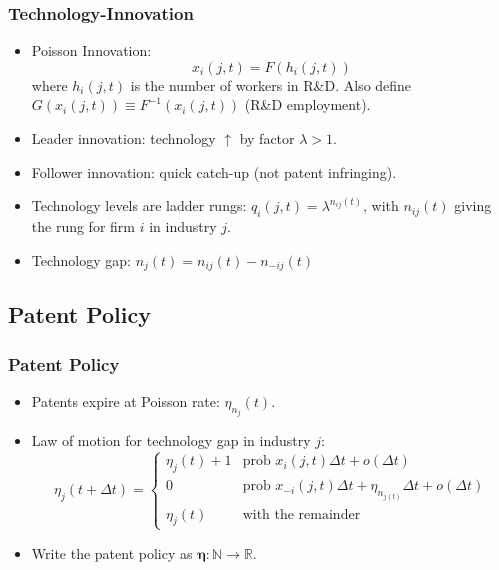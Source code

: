 \documentclass{beamer}
\begin{document}
\begin{frame}[t]\frametitle{Technology-Innovation} 
  \begin{itemize}
    \item<+-> Poisson Innovation:
      \begin{equation*} \label{eq:tech_rd_technology}
        x_i(j, t) = F(h_i(j, t))
      \end{equation*}
      where $h_i(j, t)$ is the number of workers in R\&D.
      Also define $G(x_i(j,t)) \equiv F^{-1}(x_i(j,t))$ (R\&D employment).
    \item<+-> Leader innovation: technology $\uparrow$ by factor $\lambda > 1$.
    \item<+-> Follower innovation: quick catch-up (not patent infringing).
    \item<+-> Technology levels are ladder rungs: $q_i(j, t) = \lambda^{n_{ij}(t)}$, with $n_{ij}(t)$ giving the rung for firm $i$ in industry $j$.
    \item<+-> Technology gap: $n_j(t) = n_{ij}(t) - n_{-ij}(t)$
  \end{itemize}
\end{frame}

\subsection{Patent Policy}
\label{sub:patent_policy}

\begin{frame}[t]\frametitle{Patent Policy}
  \begin{itemize}
    \item<+-> Patents expire at Poisson rate: $\eta_{n_j}(t)$.
    \item<+-> Law of motion for technology gap in industry $j$:
      \begin{equation*} \label{eq:tech_law_of_motion}
        \eta_j(t + \Delta t) =
        \begin{cases}
          \eta_j(t) + 1 & \textrm{prob } x_i(j,t)\Delta t + o(\Delta t)\\
          0 & \textrm{prob } x_{-i}(j,t)\Delta t + \eta_{n_{j(t)}}\Delta t + o(\Delta t) \\
          \eta_j(t) & \textrm{with the remainder} 
        \end{cases}
      \end{equation*}
  \item<+-> Write the patent policy as $\bm{\eta} : \mathbb{N} \rightarrow \mathbb{R}$.
  \end{itemize}
\end{frame}
\end{document}
